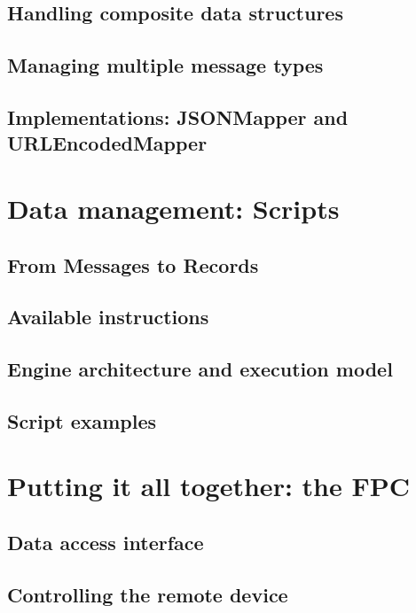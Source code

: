 \subsection{Handling composite data structures}

\subsection{Managing multiple message types}

\subsection{Implementations: JSONMapper and URLEncodedMapper}


\section{Data management: Scripts}
\label{sec:components.script}

\subsection{From Messages to Records}

\subsection{Available instructions}

\subsection{Engine architecture and execution model}

\subsection{Script examples}


\section{Putting it all together: the FPC}

\subsection{Data access interface}

\subsection{Controlling the remote device}

